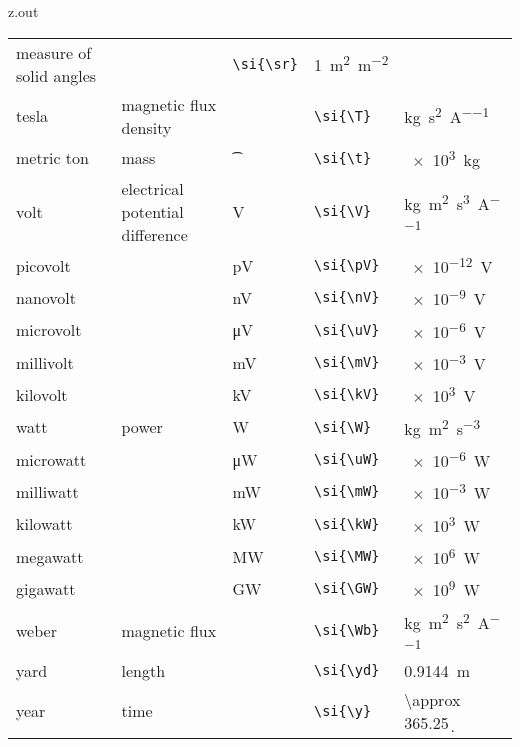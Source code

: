 \begin{VerbatimOut}{z.out}
{\begin{longtable}{@{}P{1.4in}P{1in}llP{1.8in}@{}}
      measure of solid angles&
      \si{\sr}&
      \verb+\si{\sr}+&
      \SI{1}{\m\squared\per\m\squared}\\
    \vsp
    tesla&
      magnetic flux density&
      \si{\T}&
      \verb+\si{\T}+&
      \si{\kg\per\s\squared\per\A}\\
    \vsp
    metric ton&
      mass&
      \si{\t}&
      \verb+\si{\t}+&
      \SI{e3}{\kg}\\
    \vsp
    volt&
      electrical potential difference&
      \si{\V}&
      \verb+\si{\V}+&
      \si{\kg\m\squared\per\s\cubed\per\A}\\
    \quad picovolt&
      \ditto&
      \si{\pV}&
      \verb+\si{\pV}+&
      \SI{e-12}{\V}\\
    \quad nanovolt&
      \ditto&
      \si{\nV}&
      \verb+\si{\nV}+&
      \SI{e-9}{\V}\\
    \quad microvolt&
      \ditto&
      \si{\uV}&
      \verb+\si{\uV}+&
      \SI{e-6}{\V}\\
    \quad millivolt&
      \ditto&
      \si{\mV}&
      \verb+\si{\mV}+&
      \SI{e-3}{\V}\\
    \quad kilovolt&
      \ditto&
      \si{\kV}&
      \verb+\si{\kV}+&
      \SI{e3}{\V}\\
    \vsp
    watt&
      power&
      \si{\W}&
      \verb+\si{\W}+&
      \si{\kg\m\squared\per\s\cubed}\\
    \quad microwatt&
      \ditto&
      \si{\uW}&
      \verb+\si{\uW}+&
      \SI{e-6}{\W}\\
    \quad milliwatt&
      \ditto&
      \si{\mW}&
      \verb+\si{\mW}+&
      \SI{e-3}{\W}\\
    \quad kilowatt&
      \ditto&
      \si{\kW}&
      \verb+\si{\kW}+&
      \SI{e3}{\W}\\
    \quad megawatt&
      \ditto&
      \si{\MW}&
      \verb+\si{\MW}+&
      \SI{e6}{\W}\\
    \quad gigawatt&
      \ditto&
      \si{\GW}&
      \verb+\si{\GW}+&
      \SI{e9}{\W}\\
    \vsp
    weber&
      magnetic flux&
      \si{\Wb}&
      \verb+\si{\Wb}+&
      \si{\kg\m\squared\per\s\squared\per\A}\\
    \vsp
    yard&
      length&
      \si{\yd}&
      \verb+\si{\yd}+&
      \SI{.9144}{\m}\\  %
    \vsp
    year&
      time&
      \si{\y}&
      \verb+\si{\y}+&
      \SI{\approx 365.25}{\d}\\  %
  \end{longtable}
}
\end{VerbatimOut}

